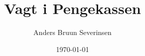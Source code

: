 

\title{Vagt i Pengekassen}
\date{\today}
\author{Anders Bruun Severinsen}



\maketitle

\tableofcontents















